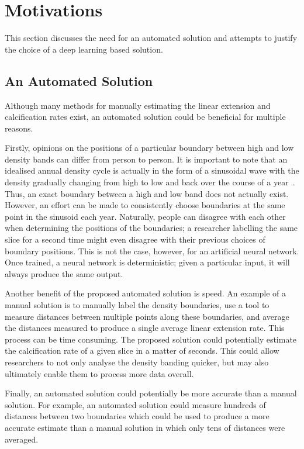 \section{Motivations}

This section discusses the need for an automated solution and attempts to justify the choice of a deep learning based solution.

\subsection{An Automated Solution}

Although many methods for manually estimating the linear extension and calcification rates exist, an automated solution could be beneficial for multiple reasons.

Firstly, opinions on the positions of a particular boundary between high and low density bands can differ from person to person. It is important to note that an idealised annual density cycle is actually in the form of a sinusoidal wave with the density gradually changing from high to low and back over the course of a year~\cite[p. 39]{coralsine}. Thus, an exact boundary between a high and low band does not actually exist. However, an effort can be made to consistently choose boundaries at the same point in the sinusoid each year. Naturally, people can disagree with each other when determining the positions of the boundaries; a researcher labelling the same slice for a second time might even disagree with their previous choices of boundary positions. This is not the case, however, for an artificial neural network. Once trained, a neural network is deterministic; given a particular input, it will always produce the same output.

Another benefit of the proposed automated solution is speed. An example of a manual solution is to manually label the density boundaries, use a tool to measure distances between multiple points along these boundaries, and average the distances measured to produce a single average linear extension rate. This process can be time consuming. The proposed solution could potentially estimate the calcification rate of a given slice in a matter of seconds. This could allow researchers to not only analyse the density banding quicker, but may also ultimately enable them to process more data overall.

Finally, an automated solution could potentially be more accurate than a manual solution. For example, an automated solution could measure hundreds of distances between two boundaries which could be used to produce a more accurate estimate than a manual solution in which only tens of distances were averaged.

